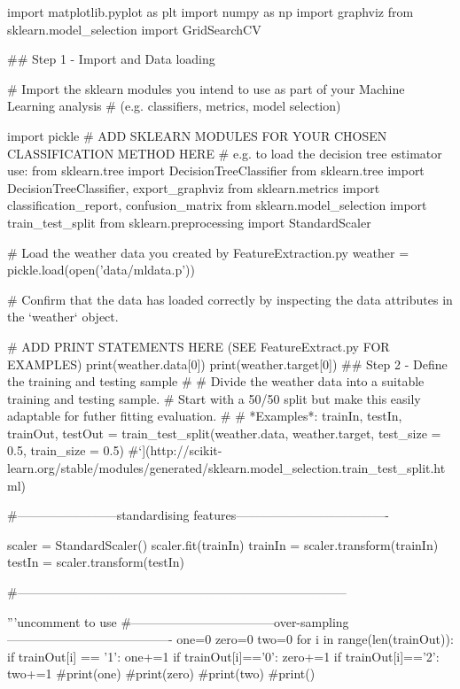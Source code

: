 \documentclass[12pt]{article}
\begin{document}
\begin{python}

import matplotlib.pyplot as plt
import numpy as np
import graphviz
from sklearn.model_selection import GridSearchCV

## Step 1 - Import and Data loading

# Import the sklearn modules you intend to use as part of your Machine Learning analysis
# (e.g. classifiers, metrics, model selection)

import pickle
# ADD SKLEARN MODULES FOR YOUR CHOSEN CLASSIFICATION METHOD HERE
# e.g. to load the decision tree estimator use: from sklearn.tree import DecisionTreeClassifier
from sklearn.tree import DecisionTreeClassifier, export_graphviz
from sklearn.metrics import classification_report, confusion_matrix
from sklearn.model_selection import train_test_split
from sklearn.preprocessing import StandardScaler

# Load the weather data you created by FeatureExtraction.py
weather = pickle.load(open('data/mldata.p'))

# Confirm that the data has loaded correctly by inspecting the data attributes in the `weather` object.

# ADD PRINT STATEMENTS HERE (SEE FeatureExtract.py FOR EXAMPLES)
print(weather.data[0])
print(weather.target[0])
## Step 2 - Define the training and testing sample
#
# Divide the weather data into a suitable training and testing sample.
# Start with a 50/50 split but make this easily adaptable for futher fitting evaluation.
#
# *Examples*:
trainIn, testIn, trainOut, testOut = train_test_split(weather.data, weather.target, test_size = 0.5, train_size = 0.5)  #`](http://scikit-learn.org/stable/modules/generated/sklearn.model_selection.train_test_split.html)


#------------------------standardising features-------------------------------------

scaler = StandardScaler()
scaler.fit(trainIn)
trainIn = scaler.transform(trainIn)
testIn = scaler.transform(testIn)


#--------------------------------------------------------------------------------

'''uncomment to use
#-----------------------------------over-sampling----------------------------------------
one=0
zero=0
two=0
for i in range(len(trainOut)):
    if trainOut[i] == '1':
        one+=1
    if trainOut[i]=='0':
        zero+=1
    if trainOut[i]=='2':
        two+=1
#print(one)
#print(zero)
#print(two)
#print()


\end{python}
\end{document}

